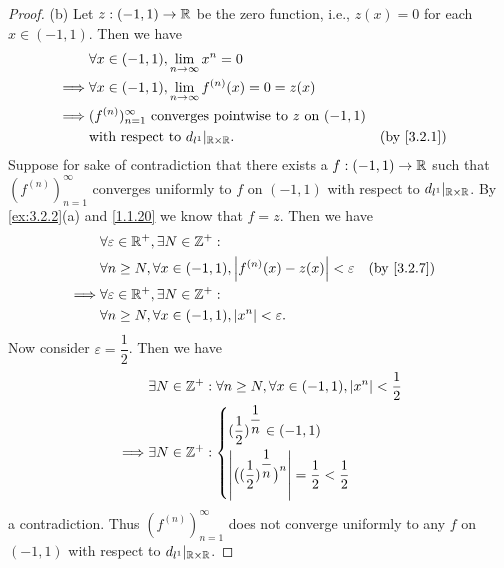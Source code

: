 \begin{proof}{(b)}
  Let \(z : (-1, 1) \to \mathbb{R}\) be the zero function, i.e., \(z(x) = 0\) for each \(x \in (-1, 1)\).
  Then we have
  \begin{align*}
             & \forall x \in (-1, 1), \lim_{n \to \infty} x^n = 0                                             \\
    \implies & \forall x \in (-1, 1), \lim_{n \to \infty} f^{(n)}(x) = 0 = z(x)                               \\
    \implies & (f^{(n)})_{n = 1}^\infty \text{ converges pointwise to } z \text{ on } (-1, 1)                 \\
             & \text{with respect to } d_{l^1}|_{\R \times \R}.                               &  & \by{3.2.1}
  \end{align*}
  Suppose for sake of contradiction that there exists a \(f : (-1, 1) \to \mathbb{R}\) such that \((f^{(n)})_{n = 1}^\infty\) converges uniformly to \(f\) on \((-1, 1)\) with respect to \(d_{l^1}|_{\mathbb{R} \times \mathbb{R}}\).
  By \cref{ex:3.2.2}(a) and \cref{1.1.20} we know that \(f = z\).
  Then we have
  \begin{align*}
             & \forall \varepsilon \in \R^+, \exists N \in \Z^+ :                                             \\
             & \forall n \geq N, \forall x \in (-1, 1), \abs{f^{(n)}(x) - z(x)} < \varepsilon &  & \by{3.2.7} \\
    \implies & \forall \varepsilon \in \R^+, \exists N \in \Z^+ :                                             \\
             & \forall n \geq N, \forall x \in (-1, 1), \abs{x^n} < \varepsilon.
  \end{align*}
  Now consider \(\varepsilon = \dfrac{1}{2}\).
  Then we have
  \begin{align*}
             & \exists N \in \mathbb{Z}^+ : \forall n \geq N, \forall x \in (-1, 1), \left\lvert x^n\right\rvert < \dfrac{1}{2}                                               \\
    \implies & \exists N \in \mathbb{Z}^+ : \begin{dcases}
                                      (\dfrac{1}{2})^{\dfrac{1}{n}} \in (-1, 1) \\
                                      \left\lvert\big((\dfrac{1}{2})^{\dfrac{1}{n}}\big)^n\right\rvert = \dfrac{1}{2} < \dfrac{1}{2}
                                    \end{dcases}
  \end{align*}
  a contradiction.
  Thus \((f^{(n)})_{n = 1}^\infty\) does not converge uniformly to any \(f\) on \((-1, 1)\) with respect to \(d_{l^1}|_{\mathbb{R} \times \mathbb{R}}\).
\end{proof}

